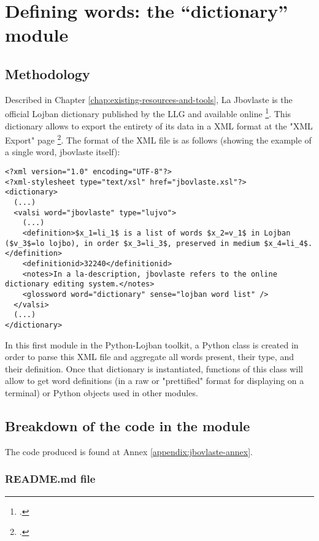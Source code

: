 \chapter{Defining words: the ``dictionary'' module}
\label{chap:creating_a_dictionary}

\section{Methodology}

Described in Chapter \ref{chap:existing-resources-and-tools}, La Jbovlaste is the official Lojban dictionary published by the LLG and available online \footcite{jbovlaste}.
This dictionary allows to export the entirety of its data in a XML format at the "XML Export" page \footcite{jbovlaste-export}.
The format of the XML file is as follows (showing the example of a single word, jbovlaste itself):

\begin{lstlisting}[caption=Example of word as defined in the official Lojban dictionary XML export]
<?xml version="1.0" encoding="UTF-8"?>
<?xml-stylesheet type="text/xsl" href="jbovlaste.xsl"?>
<dictionary>
  (...)
  <valsi word="jbovlaste" type="lujvo">
    (...)
    <definition>$x_1=li_1$ is a list of words $x_2=v_1$ in Lojban ($v_3$=lo lojbo), in order $x_3=li_3$, preserved in medium $x_4=li_4$.</definition>
    <definitionid>32240</definitionid>
    <notes>In a la-description, jbovlaste refers to the online dictionary editing system.</notes>
    <glossword word="dictionary" sense="lojban word list" />
  </valsi>
  (...)
</dictionary>
\end{lstlisting}

In this first module in the Python-Lojban toolkit, a Python class is created in order to parse this XML file and aggregate all words present,
their type, and their definition. Once that dictionary is instantiated, functions of this class will allow to get word definitions
(in a raw or "prettified" format for displaying on a terminal) or Python objects used in other modules.

\section{Breakdown of the code in the module}

The code produced is found at Annex \ref{appendix:jbovlaste-annex}.

\subsection*{README.md file}

